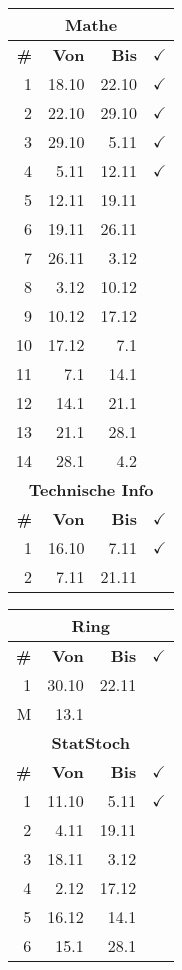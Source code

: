 \documentclass{article}
\begin{document}
\begin{table}
\begin{tabular}{r|r|r|l}
        \multicolumn{4}{c}{\textbf{Mathe}}\\
        \hline
        \hline
        \textbf{\#}&
        \textbf{Von}&
        \textbf{Bis}&
        $\checkmark$\\
        \hline
        \hline
        \color{teal}
        1&18.10&22.10&$\checkmark$\\
        \color{teal}
        2&22.10&29.10&$\checkmark$\\
        \color{teal}
        3&29.10&5.11&$\checkmark$\\
        \color{teal}
        4&5.11&12.11&$\checkmark$\\
        \color{teal}
        5&12.11&19.11\\
        6&19.11&26.11\\
        7&26.11&3.12\\
        8&3.12&10.12\\
        9&10.12&17.12\\
        10&17.12&7.1\\
        11&7.1&14.1\\
        12&14.1&21.1\\
        13&21.1&28.1\\
        14&28.1&4.2\\
        \hline
        \hline
        \multicolumn{4}{c}{\textbf{Technische Info}}\\
        \hline
        \hline
        \textbf{\#}&
        \textbf{Von}&
        \textbf{Bis}&
        $\checkmark$\\
        \hline
        \hline
        \color{teal}
        1&16.10&7.11&$\checkmark$\\
        \color{teal}
        2&7.11&21.11&\\
        \hline
        \hline
    \end{tabular}
    \begin{tabular}{r|r|r|l}
        \multicolumn{4}{c}{\textbf{Ring}}\\
        \hline
        \hline
        \textbf{\#}&
        \textbf{Von}&
        \textbf{Bis}&
        $\checkmark$\\
        \hline
        \hline
        \color{teal}
        1&30.10&22.11&\\
        M&13.1&\\
        \hline
        \hline

        \multicolumn{4}{c}{\textbf{StatStoch}}\\
        \hline
        \hline
        \textbf{\#}&
        \textbf{Von}&
        \textbf{Bis}&
        $\checkmark$\\
        \hline
        \hline
        \color{teal}
        1&11.10&5.11&$\checkmark$\\
        \color{teal}
        2&4.11&19.11\\
        3&18.11&3.12\\
        4&2.12&17.12\\
        5&16.12&14.1\\
        6&15.1&28.1\\
        \hline
        \hline


\end{tabular}
\end{table}
\end{document}
